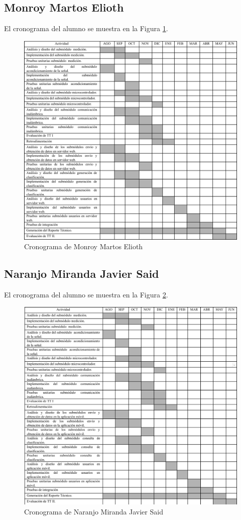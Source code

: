 \subsection{Monroy Martos Elioth}
El cronograma del alumno se muestra en la Figura \ref{fig:cronograma_elioth}.
\begin{figure}[H]
	\centering
	\includegraphics[width=1\textwidth]{Apendice1/cronogramas/elioth}
	\caption{Cronograma de Monroy Martos Elioth}
	\label{fig:cronograma_elioth}
\end{figure}
\subsection{Naranjo Miranda Javier Said}
El cronograma del alumno se muestra en la Figura \ref{fig:cronograma_said}.
\begin{figure}[H]
	\centering
	\includegraphics[width=1\textwidth]{Apendice1/cronogramas/said}
	\caption{Cronograma de Naranjo Miranda Javier Said}
	\label{fig:cronograma_said}
\end{figure}